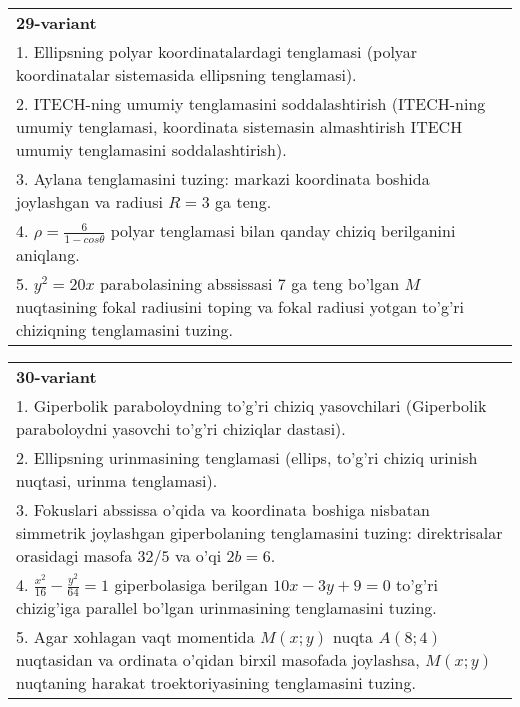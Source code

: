 \documentclass{article}
\begin{document}
\begin{tabular}{m{17cm}}
\textbf{29-variant}\\
1. Ellipsning polyar koordinatalardagi tenglamasi (polyar koordinatalar sistemasida ellipsning tenglamasi).\\

2. ITECH-ning umumiy tenglamasini soddalashtirish (ITECH-ning umumiy tenglamasi, koordinata sistemasin almashtirish ITECH umumiy tenglamasini soddalashtirish).\\

3. Aylana tenglamasini tuzing: markazi koordinata boshida joylashgan va radiusi $R=3$ ga teng.\\

4. $\rho = \frac{6}{1 - cos\theta}$ polyar tenglamasi bilan qanday chiziq berilganini aniqlang.  \\

5. $y^{2} = 20x$ parabolasining abssissasi 7 ga teng bo'lgan $M$ nuqtasining fokal radiusini toping va fokal radiusi yotgan to'g'ri chiziqning tenglamasini tuzing.  
\end{tabular}
\vspace{1cm}


\begin{tabular}{m{17cm}}
\textbf{30-variant}\\
1. Giperbolik paraboloydning to'g'ri chiziq yasovchilari (Giperbolik paraboloydni yasovchi to'g'ri chiziqlar dastasi).\\

2. Ellipsning urinmasining tenglamasi (ellips, to'g'ri chiziq urinish nuqtasi, urinma tenglamasi).\\

3. Fokuslari abssissa o'qida va koordinata boshiga nisbatan simmetrik joylashgan giperbolaning tenglamasini tuzing: direktrisalar orasidagi masofa $32/5$ va o'qi $2b=6$.\\

4. $\frac{x^{2}}{16} - \frac{y^{2}}{64} = 1$ giperbolasiga berilgan $10x - 3y + 9 = 0$ to'g'ri chizig'iga parallel bo'lgan urinmasining tenglamasini tuzing.  \\

5. Agar xohlagan vaqt momentida $M(x;y)$ nuqta $A(8;4)$ nuqtasidan va ordinata o'qidan birxil masofada joylashsa, $M(x;y)$ nuqtaning harakat troektoriyasining tenglamasini tuzing.  
\end{tabular}
\vspace{1cm}
\end{document}
